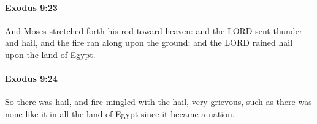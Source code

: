 		\paragraph{Exodus 9:23} %
			\label{EXODUS-9-23}

			And Moses stretched forth his rod toward heaven: and the LORD sent thunder and hail, and the fire ran along upon the ground; and the LORD rained hail upon the land of Egypt.


		\paragraph{Exodus 9:24} %
			\label{EXODUS-9-24}

			So there was hail, and fire mingled with the hail, very grievous, such as there was none like it in all the land of Egypt since it became a nation.


